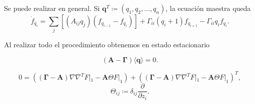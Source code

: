 \documentclass[xcolor=dvipsnames]{beamer}
\begin{document}
\begin{frame}
Se puede realizar en general. Si $\mathbf{q}^T \coloneqq (q_1,q_2,\dots,q_n)$,
la ecuaci\'on maestra queda
\begin{equation*}
\dot{f}_{q_i} = \sum_j \left[\left(A_{ij}q_j\right) \left(f_{q_{i-1}} - f_{q_i}\right)\right] + \Gamma_{ii}(q_i+1)f_{q_{i+1}} -\Gamma_{ii}q_if_{q_i}.
\end{equation*}

Al realizar todo el procedimiento obtenemos en estado estacionario

$$\left(\mathbf{A} - \mathbf{\Gamma}\right)\langle \mathbf{q} \rangle = 0.$$

$$0 = \left( \left( \mathbf{\Gamma} - \mathbf{A}\right) \nabla\nabla^TF|_1 - \mathbf{A}\Theta F|_1 \right) +  \left( \left( \mathbf{\Gamma} - \mathbf{A}\right) \nabla\nabla^TF|_1 - \mathbf{A}\Theta F|_1\right)^T,$$ 
$$\Theta_{ij} \coloneqq \delta_{ij}\frac{\partial}{\partial z_i}.$$
\end{frame}


\end{document}
